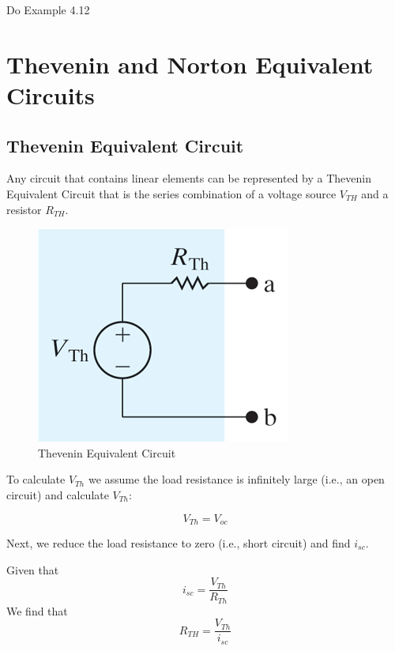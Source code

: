 \documentclass[14pt]{memoir}
\begin{document}
\begin{tcolorbox}
Do Example 4.12
\end{tcolorbox}

\section{Thevenin and Norton Equivalent Circuits}

\subsection{Thevenin Equivalent Circuit}

Any circuit that contains linear elements can be represented by a Thevenin Equivalent Circuit that is the series combination of a voltage source $V_{TH}$ and a resistor $R_{TH}$.

\begin{figure}[H]
\begin{center}
\includegraphics[scale=0.50]{fig/fig04_46.png}
\caption{Thevenin Equivalent Circuit}
\label{fig:fig04_46}
\end{center}
\end{figure}

To calculate $V_{Th}$ we assume the load resistance is infinitely large (i.e., an open circuit) and calculate $V_{Th}$:

\begin{equation}
V_{Th} = V_{oc}
\end{equation} 

Next, we reduce the load resistance to zero (i.e., short circuit) and find $i_{sc}$.

Given that 
\begin{equation}
i_{sc} = \frac{V_{Th}}{R_{Th}}
\end{equation}
We find that
\begin{equation}
R_{TH} = \frac{V_{Th}}{i_{sc}}
\end{equation}
\end{document}
